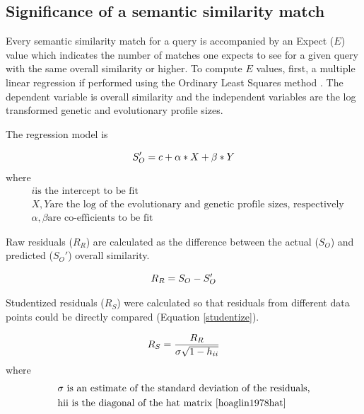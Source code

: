 \documentclass{article}
\begin{document}
\subsection{Significance of a semantic similarity match}
Every semantic similarity match for a query is accompanied by an Expect ($E$) value which indicates the number of matches one expects to see for a given query with the same overall similarity or higher. To compute $E$ values, first, a multiple linear regression if performed using the Ordinary Least Squares method \cite{haggstrom1983logistic}.  The dependent variable is overall similarity and the independent variables are the log transformed genetic and evolutionary profile sizes. 

The regression model is

\begin{equation}
\label{regressionmodel}
S_O' = c + \alpha*X + \beta*Y \\
\end{equation}
where
\begin{align*}
&  i \textrm{is the intercept to be fit}\\
& X, Y \textrm{are the log of the evolutionary and genetic profile sizes, respectively} \\
& \alpha, \beta \textrm{are co-efficients to be fit}
\end{align*}

Raw residuals ($R_R$) are calculated as the difference between the actual ($S_O$) and predicted ($S_O'$) overall similarity.

\begin{equation}
\label{residual}
R_R=S_O - S_O' \\
\end{equation}

Studentized residuals ($R_S$) were calculated so that residuals from different data points could be directly compared (Equation \ref{studentize}).


\begin{equation}
\label{studentize}
R_S = \frac{R_R}{\sigma \sqrt{1-h_{ii}}} \\
\end{equation}
where 
\begin{align*}
& \sigma \textrm{ is an estimate of the standard deviation of the residuals,} \\
& \textrm{hii is the diagonal of the hat matrix \cite{hoaglin1978hat}} \\
\end{align*}
\end{document}
